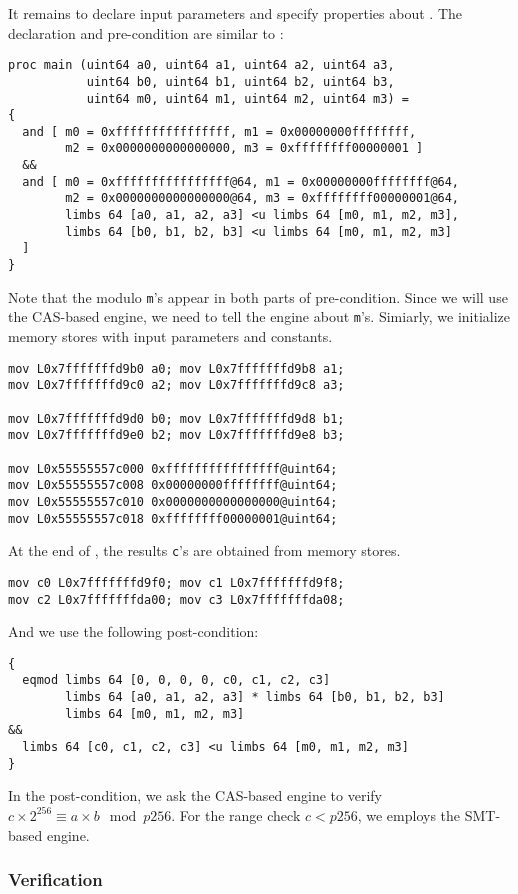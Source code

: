 \documentclass{amsproc}
\begin{document}
It remains to declare input parameters and specify properties about
\nistzmul. The declaration and pre-condition are similar to \nistzadd:
\begin{verbatim}
proc main (uint64 a0, uint64 a1, uint64 a2, uint64 a3,
           uint64 b0, uint64 b1, uint64 b2, uint64 b3,
           uint64 m0, uint64 m1, uint64 m2, uint64 m3) =
{
  and [ m0 = 0xffffffffffffffff, m1 = 0x00000000ffffffff,
        m2 = 0x0000000000000000, m3 = 0xffffffff00000001 ]
  &&
  and [ m0 = 0xffffffffffffffff@64, m1 = 0x00000000ffffffff@64,
        m2 = 0x0000000000000000@64, m3 = 0xffffffff00000001@64,
        limbs 64 [a0, a1, a2, a3] <u limbs 64 [m0, m1, m2, m3],
        limbs 64 [b0, b1, b2, b3] <u limbs 64 [m0, m1, m2, m3]
  ]
}
\end{verbatim}
Note that the modulo \texttt{m}'s appear in both parts of
pre-condition. Since we will use the CAS-based engine, we need to tell
the engine about \texttt{m}'s. Simiarly, we initialize memory stores
with input parameters and constants.
\begin{verbatim}
mov L0x7fffffffd9b0 a0; mov L0x7fffffffd9b8 a1;
mov L0x7fffffffd9c0 a2; mov L0x7fffffffd9c8 a3;

mov L0x7fffffffd9d0 b0; mov L0x7fffffffd9d8 b1;
mov L0x7fffffffd9e0 b2; mov L0x7fffffffd9e8 b3;

mov L0x55555557c000 0xffffffffffffffff@uint64;
mov L0x55555557c008 0x00000000ffffffff@uint64;
mov L0x55555557c010 0x0000000000000000@uint64;
mov L0x55555557c018 0xffffffff00000001@uint64;
\end{verbatim}

At the end of \nistzmulcl, the results \texttt{c}'s are obtained from
memory stores.
\begin{verbatim}
mov c0 L0x7fffffffd9f0; mov c1 L0x7fffffffd9f8;
mov c2 L0x7fffffffda00; mov c3 L0x7fffffffda08;
\end{verbatim}
And we use the following post-condition:
\begin{verbatim}
{
  eqmod limbs 64 [0, 0, 0, 0, c0, c1, c2, c3]
        limbs 64 [a0, a1, a2, a3] * limbs 64 [b0, b1, b2, b3]
        limbs 64 [m0, m1, m2, m3]
&&
  limbs 64 [c0, c1, c2, c3] <u limbs 64 [m0, m1, m2, m3]
}
\end{verbatim}
In the post-condition, we ask the CAS-based engine to verify $c \times
2^{256} \equiv a \times b \mod p256$. For the range check $c < p256$,
we employs the SMT-based engine.

\subsubsection{Verification}
\end{document}
